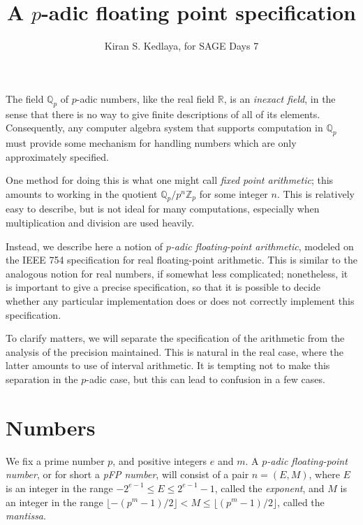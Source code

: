 \documentclass[12pt]{article}
\def\QQ{\mathbb{Q}}
\def\RR{\mathbb{R}}
\def\ZZ{\mathbb{Z}}
\begin{document}
\title{A $p$-adic floating point specification}
\author{Kiran S. Kedlaya, for SAGE Days 7}

\maketitle

The field $\QQ_p$ of $p$-adic numbers, like the real field $\RR$, is an
\emph{inexact field}, in the sense that there is no way to give
finite descriptions of all of its elements. Consequently, any computer
algebra system that supports computation in $\QQ_p$ must provide some
mechanism for handling numbers which are only approximately specified.

One method for doing this is what one might call \emph{fixed point 
arithmetic}; this amounts to working in the quotient $\QQ_p / p^n \ZZ_p$
for some integer $n$. This is relatively easy to describe, but is not
ideal for many computations, especially when multiplication and
division are used heavily.

Instead, we describe here a notion of 
\emph{$p$-adic floating-point arithmetic}, modeled on the IEEE 754 
specification for real floating-point arithmetic. This is similar to
the analogous notion for real numbers, if somewhat less complicated;
nonetheless, it is important to give a precise specification, so that it 
is possible to decide whether any particular implementation does or does
not correctly implement this specification.

To clarify matters, we will separate the specification of the arithmetic
from the analysis of the precision maintained. This is natural in the real
case, where the latter amounts to use of interval arithmetic. It is 
tempting not to make this separation in the $p$-adic case, but this
can lead to confusion in a few cases.

\section{Numbers}

We fix a prime number $p$, and positive integers $e$ and $m$.
A \emph{$p$-adic floating-point number}, or for short a \emph{pFP number},
will consist of a pair $n = (E,M)$,
where $E$ is an integer in the range $-2^{e-1} \leq E \leq 2^{e-1} - 1$,
called the \emph{exponent}, and $M$ is an integer in the range
$\lfloor -(p^{m}-1)/2 \rfloor < M \leq \lfloor (p^m-1)/2 \rfloor$,
called the \emph{mantissa}.
\end{document}
